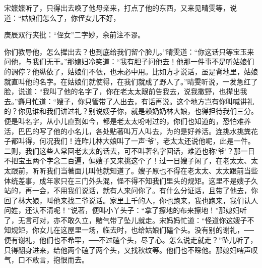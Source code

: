 \begin{parag}
    宋嬷嬷听了，只得出去唤了他母亲来，打点了他的东西，又来见晴雯等，说道：“姑娘们怎么了，你侄女儿不好，\begin{note}庚辰双行夹批：“侄女”二字妙，余前注不谬。\end{note}你们教导他，怎么撵出去？也到底给我们留个脸儿。”晴雯道：“你这话只等宝玉来问他，与我们无干。”那媳妇冷笑道：“我有胆子问他去！他那一件事不是听姑娘们的调停？他纵依了，姑娘们不依，也未必中用。比如方才说话，虽是背地里，姑娘就直叫他的名字。在姑娘们就使得，在我们就成了野人了。”晴雯听说，一发急红了脸，说道：“我叫了他的名字了，你在老太太跟前告我去，说我撒野，也撵出我去。”麝月忙道：“嫂子，你只管带了人出去，有话再说。这个地方岂有你叫喊讲礼的？你见谁和我们讲过礼？别说嫂子你，就是赖奶奶林大娘，也得担待我们三分。便是叫名字，从小儿直到如今，都是老太太吩咐过的，你们也知道的，恐怕难养活，巴巴的写了他的小名儿，各处贴著叫万人叫去，为的是好养活。连挑水挑粪花子都叫得，何况我们！连昨儿林大娘叫了一声‘爷’，老太太还说他呢，此是一件。二则，我们这些人常回老太太的话去，可不叫著名字回话，难道也称‘爷’？那一日不把宝玉两个字念二百遍，偏嫂子又来挑这个了！过一日嫂子闲了，在老太太、太太跟前，听听我们当著面儿叫他就知道了。嫂子原也不得在老太太、太太跟前当些体统差事，成年家只在三门外头混，怪不得不知我们里头的规矩。这里不是嫂子久站的，再一会，不用我们说话，就有人来问你了。有什么分证话，且带了他去，你回了林大娘，叫他来找二爷说话。家里上千的人，你也跑来，我也跑来，我们认人问姓，还认不清呢！”说著，便叫小丫头子：“拿了擦地的布来擦地！”那媳妇听了，无言可对，亦不敢久立，赌气带了坠儿就走。宋妈妈忙道：“怪道你这嫂子不知规矩，你女儿在这屋里一场，临去时，也给姑娘们磕个头。没有别的谢礼，──便有谢礼，他们也不希罕，──不过磕个头，尽了心。怎么说走就走？”坠儿听了，只得翻身进来，给他两个磕了两个头，又找秋纹等。他们也不睬他。那媳妇嗐声叹气，口不敢言，抱恨而去。
\end{parag}


